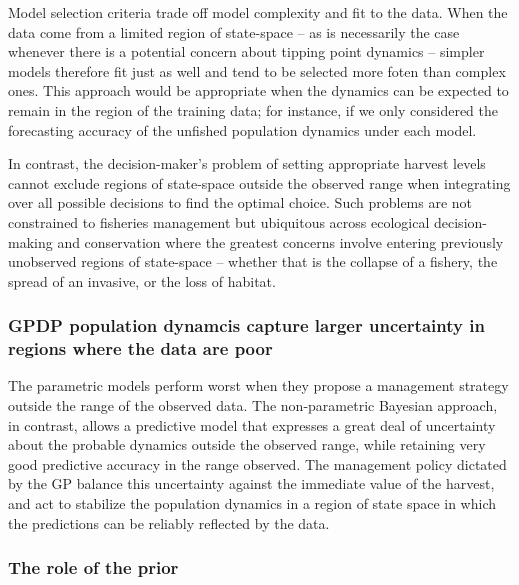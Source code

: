 \documentclass[author-year, 12pt,review]{elsarticle} %
\begin{document}
Model selection criteria trade off model complexity and fit to the data.
When the data come from a limited region of state-space -- as is
necessarily the case whenever there is a potential concern about tipping
point dynamics -- simpler models therefore fit just as well and tend to
be selected more foten than complex ones. This approach would be
appropriate when the dynamics can be expected to remain in the region of
the training data; for instance, if we only considered the forecasting
accuracy of the unfished population dynamics under each model.

In contrast, the decision-maker's problem of setting appropriate harvest
levels cannot exclude regions of state-space outside the observed range
when integrating over all possible decisions to find the optimal choice.
Such problems are not constrained to fisheries management but ubiquitous
across ecological decision-making and conservation where the greatest
concerns involve entering previously unobserved regions of state-space
-- whether that is the collapse of a fishery, the spread of an invasive,
or the loss of habitat.

\subsubsection{GPDP population dynamcis capture larger uncertainty in
regions where the data are
poor}\label{gpdp-population-dynamcis-capture-larger-uncertainty-in-regions-where-the-data-are-poor}

The parametric models perform worst when they propose a management
strategy outside the range of the observed data. The non-parametric
Bayesian approach, in contrast, allows a predictive model that expresses
a great deal of uncertainty about the probable dynamics outside the
observed range, while retaining very good predictive accuracy in the
range observed. The management policy dictated by the GP balance this
uncertainty against the immediate value of the harvest, and act to
stabilize the population dynamics in a region of state space in which
the predictions can be reliably reflected by the data.

\subsubsection{The role of the prior}\label{the-role-of-the-prior}
\end{document}
